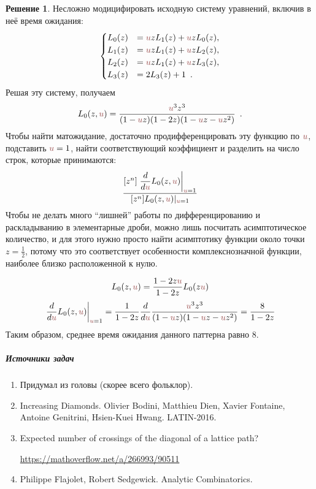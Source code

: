\documentclass[a5paper]{article}
\theoremstyle{definition}
\newtheorem*{solution}{Решение}
\begin{document}
\begin{solution}
Несложно модицифировать исходную систему уравнений, включив в неё время
ожидания:
\begin{equation}
\begin{cases}
    L_0(z) &= \uu z L_1(z) + \uu z L_0(z) ,\\
    L_1(z) &= \uu z L_1(z) + \uu z L_2(z) ,\\
    L_2(z) &= \uu z L_1(z) + \uu z L_3(z) ,\\
    L_3(z) &= 2 L_3(z) + 1\enspace.
\end{cases}
\end{equation}
Решая эту систему, получаем
\begin{equation}
    L_0(z, \uu) = \dfrac{\uu^3 z^3}{(1 - \uu z)(1 - 2z)(1 - \uu z - \uu z^2)}
    \enspace .
\end{equation}
Чтобы найти матожидание, достаточно продифференцировать эту функцию по \( \uu
\), подставить \( \uu = 1 \), найти соответствующий коэффициент и разделить на
число строк, которые принимаются:
\begin{equation}
    \dfrac{[z^n]\left. \dfrac{d}{d \uu} L_0(z, \uu) \right|_{\uu = 1}}
    {[z^n] L_0(z, \uu)|_{\uu = 1}}
\end{equation}
Чтобы не делать много ``лишней'' работы по дифференцированию и раскладыванию в
элементарные дроби, можно лишь посчитать асимптотическое количество, и для этого
нужно просто найти асимптотику функции около точки \( z = \frac12 \), потому что
это соответствует особенности комплекснозначной функции, наиболее близко
расположенной к нулю.

\begin{equation}
    L_0(z, \uu) = \dfrac{1 - 2z\uu}{1 - 2z} L_0(z \uu)
\end{equation}
\begin{equation}
    \left.\dfrac{d}{d\uu} L_0(z, \uu)\right|_{\uu = 1} = 
    \dfrac{1}{1 - 2z} \dfrac{d}{d \uu} \dfrac{\uu^3 z^3}{(1 - \uu z)(1 - \uu z -
\uu z^2)} 
    = \dfrac{8}{1 - 2z}
\end{equation}
Таким образом, среднее время ожидания данного паттерна равно \( 8 \).
\end{solution}

\subparagraph*{Источники задач}
\begin{enumerate}
\item Придумал из головы (скорее всего фольклор).
\item Increasing Diamonds. Olivier Bodini, Matthieu Dien, Xavier Fontaine,
Antoine Genitrini, Hsien-Kuei Hwang. LATIN-2016.
\item Expected number of crossings of the diagonal of a lattice path? 

\url{https://mathoverflow.net/a/266993/90511}
\item Philippe Flajolet, Robert Sedgewick. Analytic Combinatorics.
\end{enumerate}
\end{document}
